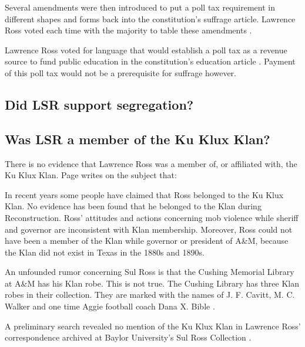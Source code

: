 \documentclass[12pt]{article}
\begin{document}
Several amendments were then introduced to put a poll tax requirement in different shapes and forms back into the constitution's suffrage article. Lawrence Ross voted each time with the majority to table these amendments \cite[pg. 308-310]{tx:1876constitution:journ}.

Lawrence Ross voted for language that would establish a poll tax as a revenue source to fund public education in the constitution's education article \cite[pg. 330-333]{tx:1876constitution:journ}. Payment of this poll tax would not be a prerequisite for suffrage however. 

\newpage
\subsection{Did LSR support segregation?}

\newpage
\subsection{Was LSR a member of the Ku Klux Klan?}
There is no evidence that Lawrence Ross was a member of, or affiliated with, the Ku Klux Klan. Page writes on the subject that:

\begin{displayquote}
In recent years some people have claimed that Ross belonged to the Ku Klux Klan.  No evidence has been found that he belonged to the Klan during Reconstruction.  Ross’ attitudes and actions concerning mob violence while sheriff and governor are inconsistent with Klan membership.  Moreover, Ross could not have been a member of the Klan while governor or president of A\&M, because the Klan did not exist in Texas in the 1880s and 1890s.

An unfounded rumor concerning Sul Ross is that the Cushing Memorial Library at A\&M has his Klan robe.  This is not true.  The Cushing Library has three Klan robes in their collection.  They are marked with the names of J. F. Cavitt, M. C. Walker and one time Aggie football coach Dana X. Bible \cite[pg. 253]{page}.
\end{displayquote}

A preliminary search revealed no mention of the Ku Klux Klan in Lawrence Ross' correspondence archived at Baylor University's Sul Ross Collection \cite{vaughan:email}.

\newpage
\end{document}
